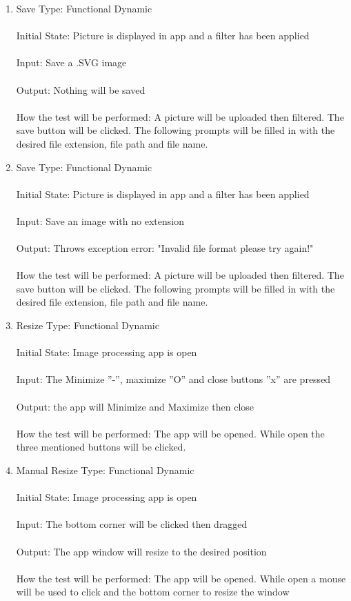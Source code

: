 \documentclass[12pt, titlepage]{article}
\begin{document}
\begin{enumerate}
\item{Save}
Type: Functional Dynamic \\ \\
Initial State: Picture is displayed in app and a filter has been applied \\ \\
Input: Save a .SVG image \\ \\
Output: Nothing will be saved \\ \\
How the test will be performed: A picture will be uploaded then filtered. The save button will be clicked. The following prompts will be filled in with the desired file extension, file path and file name.

\item{Save}
Type: Functional Dynamic \\ \\
Initial State: Picture is displayed in app and a filter has been applied \\ \\
Input: Save an image with no extension \\ \\
Output: Throws exception error: "Invalid file  format please try again!" \\ \\
How the test will be performed: A picture will be uploaded then filtered. The save button will be clicked. The following prompts will be filled in with the desired file extension, file path and file name.

\item{Resize}
Type: Functional Dynamic \\ \\
Initial State: Image processing app is open \\ \\
Input: The Minimize ''-'', maximize ''O'' and close buttons ''x'' are pressed \\ \\
Output: the app will Minimize and Maximize then close \\ \\
How the test will be performed: The app will be opened. While open the three mentioned buttons will be clicked.

\item{Manual Resize}
Type: Functional Dynamic \\ \\
Initial State: Image processing app is open \\ \\
Input: The bottom corner will be clicked then dragged \\ \\
Output: The app window will resize to the desired position \\ \\
How the test will be performed: The app will be opened. While open a mouse will be used to click and the bottom corner to resize the window
 

\end{enumerate}
\end{document}
